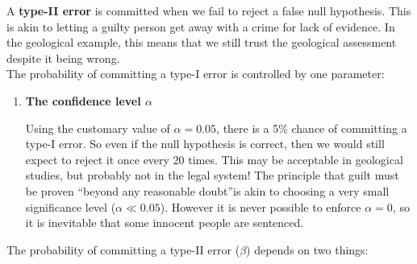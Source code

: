 A \textbf{type-II error} is committed when we fail to reject a false
null hypothesis.  This is akin to letting a guilty person get away
with a crime for lack of evidence. In the geological example, this
means that we still trust the geological assessment despite it being
wrong.\\

The probability of committing a type-I error is controlled by one
parameter:
\begin{enumerate}
\item {\bf The confidence level $\alpha$}
  
  Using the customary value of $\alpha=0.05$, there is a 5\% chance of
  committing a type-I error. So even if the null hypothesis is
  correct, then we would still expect to reject it once every 20
  times. This may be acceptable in geological studies, but probably
  not in the legal system! The principle that guilt must be proven
  ``beyond any reasonable doubt''is akin to choosing a very small
  significance level ($\alpha\ll{0.05}$). However it is never possible
  to enforce $\alpha=0$, so it is inevitable that some innocent people
  are sentenced.
\end{enumerate}

The probability of committing a type-II error ($\beta$) depends on two
things:

